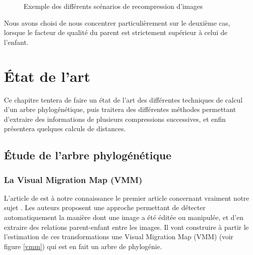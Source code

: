 \documentclass[utf8,final]{stageM2R} %
\begin{document}
\begin{figure}[H]
\begin{center}
{}
      \caption{Exemple des différents scénarios de recompression d'images}
      \label{comp_vaste}
    \end{center}
  \end{figure}

Nous avons choisi de nous concentrer particulièrement sur le deuxième cas, lorsque le facteur de qualité du parent est strictement supérieur à celui de l'enfant.

\chapter{État de l'art}
\label{chap2}
Ce chapitre tentera de faire un état de l'art des différentes techniques de calcul d'un arbre phylogénétique, puis traitera des différentes méthodes permettant d'extraire des informations de plusieurs compressions successives, et enfin présentera quelques calculs de distances.
\section{Étude de l'arbre phylogénétique}
\label{etude}
\subsection{La Visual Migration Map (VMM)}
L'article de  est à notre connaissance le premier article concernant vraiment notre sujet \autocite{kennedy2008internet}. Les auteurs proposent une approche permettant de détecter automatiquement la manière dont une image a été éditée ou manipulée, et d'en extraire des relations parent-enfant entre les images. Il vont construire à partir le l'estimation de ces transformations une Visual Migration Map (VMM) (voir figure \ref{vmm}) qui est en fait un arbre de phylogénie.
\end{document}
